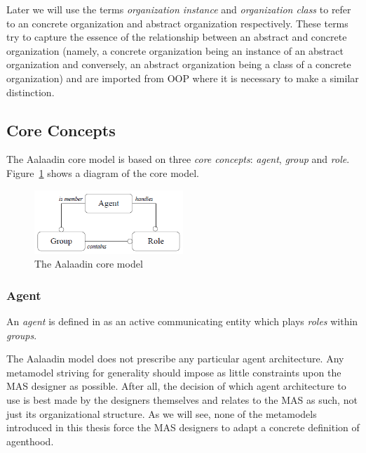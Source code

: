 Later we will use the terms \textit{organization instance} and \textit{organization class} to refer to an concrete organization and abstract organization respectively.
These terms try to capture the essence of the relationship between an abstract and concrete organization (namely, a concrete organization being an instance of an abstract organization and conversely, an abstract organization being a class of a concrete organization) and are imported from OOP where it is necessary to make a similar distinction. 

\subsection{Core Concepts}

The Aalaadin core model is based on three \textit{core concepts}: \textit{agent}, \textit{group} and \textit{role}.
Figure~\ref{figure:aalaadin-core-model} shows a diagram of the core model.

\begin{figure}[h]
	\centering
	\includegraphics[width=0.5\textwidth]{images/aalaadin-core-model.png}
	\caption{The Aalaadin core model}
	\label{figure:aalaadin-core-model}
\end{figure}

\subsubsection*{Agent}

An \textit{agent} is defined in \cite{Ferber97} as an active communicating entity which plays \textit{roles} within \textit{groups}.

The Aalaadin model does not prescribe any particular agent architecture.
Any metamodel striving for generality should impose as little constraints upon the MAS designer as possible.
After all, the decision of which agent architecture to use is best made by the designers themselves and relates to the MAS as such, not just its organizational structure.
As we will see, none of the metamodels introduced in this thesis force the MAS designers to adapt a concrete definition of agenthood.

